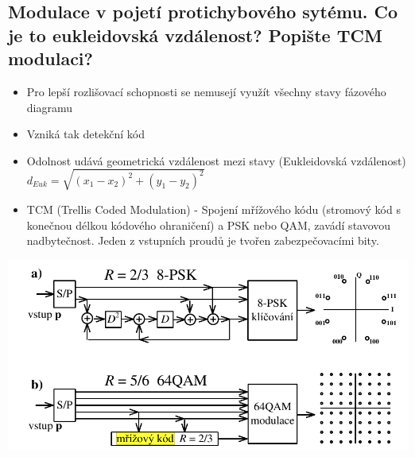 \subsection{Modulace v pojetí protichybového sytému. Co je to eukleidovská vzdálenost? Popište
TCM modulaci?}
\begin{itemize}
    \item Pro lepší rozlišovací schopnosti se nemusejí využít všechny stavy fázového diagramu
    \item Vzniká tak detekční kód
    \item Odolnost udává geometrická vzdálenost mezi stavy (Eukleidovská vzdálenost)
    $d_{Euk}=\sqrt{(x_1-x_2)^2+(y_1-y_2)^2}$
    \item TCM (Trellis Coded Modulation) - Spojení mřížového kódu (stromový kód s konečnou délkou kódového ohraničení)
    a PSK nebo QAM, zavádí stavovou nadbytečnost. Jeden z vstupních proudů je tvořen zabezpečovacími bity.
\end{itemize}
\includegraphics[width=16cm]{images/11_tcm.png}

